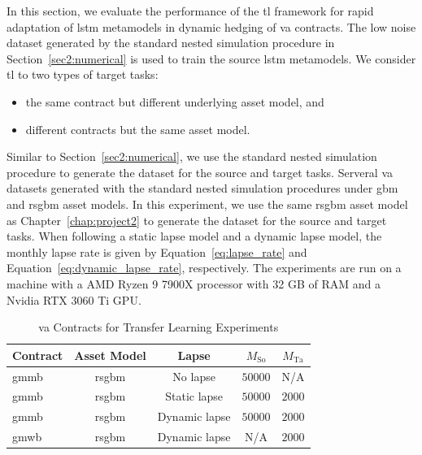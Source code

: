 In this section, we evaluate the performance of the \gls{tl} framework for rapid adaptation of \gls{lstm} metamodels in dynamic hedging of \gls{va} contracts.
The low noise dataset generated by the standard nested simulation procedure in Section~\ref{sec2:numerical} is used to train the source \gls{lstm} metamodels.
We consider \gls{tl} to two types of target tasks: 
\begin{itemize}
    \item the same contract but different underlying asset model, and
    \item different contracts but the same asset model.
\end{itemize}  
Similar to Section~\ref{sec2:numerical}, we use the standard nested simulation procedure to generate the dataset for the source and target tasks.
Serveral \gls{va} datasets generated with the standard nested simulation procedures under \gls{gbm} and \gls{rsgbm} asset models.
In this experiment, we use the same \gls{rsgbm} asset model as Chapter~\ref{chap:project2} to generate the dataset for the source and target tasks.
When following a static lapse model and a dynamic lapse model, the monthly lapse rate is given by Equation~\ref{eq:lapse_rate} and Equation~\ref{eq:dynamic_lapse_rate}, respectively.
The experiments are run on a machine with a AMD Ryzen 9 7900X processor with 32 GB of RAM and a Nvidia RTX $\num{3060}$ Ti GPU.

\begin{table}[ht!] 
    \centering
    \begin{tabular}{lcccc} 
    \toprule
    \textbf{Contract} & \textbf{Asset Model} & \textbf{Lapse} & \textbf{$M_{\text{So}}$}  & \textbf{$M_{\text{Ta}}$}\\
    \midrule
    \gls{gmmb} & \gls{rsgbm} & No lapse & $\num{50000}$ & N/A \\
    \gls{gmmb} & \gls{rsgbm} & Static lapse & $\num{50000}$ & $\num{2000}$ \\
    \gls{gmmb} & \gls{rsgbm} & Dynamic lapse & $\num{50000}$ & $\num{2000}$ \\
    \gls{gmwb} & \gls{rsgbm} & Dynamic lapse & N/A & $\num{2000}$ \\
    \bottomrule
    \end{tabular}
    \caption{\gls{va} Contracts for Transfer Learning Experiments}
    \label{tab3:contracts}
\end{table}

